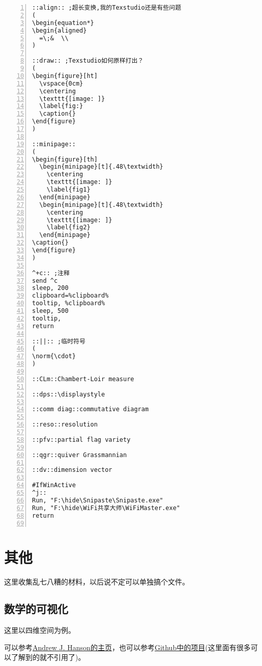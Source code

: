 \documentclass[11pt]{amsart}
\begin{document}
\begin{lstlisting}[numbers=left,numberstyle=\tiny,numbersep=10pt]
::align:: ;超长变换,我的Texstudio还是有些问题
(
\begin{equation*}
\begin{aligned}
  =\;&  \\
)

::draw:: ;Texstudio如何原样打出？
(
\begin{figure}[ht]
  \vspace{0cm}
  \centering
  \texttt{[image: ]}
  \label{fig:}
  \caption{}
\end{figure}
)

::minipage::
(
\begin{figure}[th]
  \begin{minipage}[t]{.48\textwidth}
    \centering
    \texttt{[image: ]}
    \label{fig1}
  \end{minipage}
  \begin{minipage}[t]{.48\textwidth}
    \centering
    \texttt{[image: ]}
    \label{fig2}
  \end{minipage}
\caption{}
\end{figure}
)

^+c:: ;注释
send ^c
sleep, 200
clipboard=%clipboard%
tooltip, %clipboard%
sleep, 500
tooltip,
return

::||:: ;临时符号
(
\norm{\cdot} 
)

::CLm::Chambert-Loir measure

::dps::\displaystyle

::comm diag::commutative diagram

::reso::resolution

::pfv::partial flag variety

::qgr::quiver Grassmannian

::dv::dimension vector

#IfWinActive
^j::  
Run, "F:\hide\Snipaste\Snipaste.exe"
Run, "F:\hide\WiFi共享大师\WiFiMaster.exe"
return


\end{lstlisting}

\section{其他}
这里收集乱七八糟的材料，以后说不定可以单独搞个文件。
\subsection{数学的可视化}
这里以四维空间为例。

可以参考\href{https://legacy.cs.indiana.edu/~hansona/}{Andrew J. Hanson的主页}，也可以参考\href{https://github.com/wxyhly/4dViewer}{Github中的项目}(这里面有很多可以了解到的就不引用了)。
\end{document}
